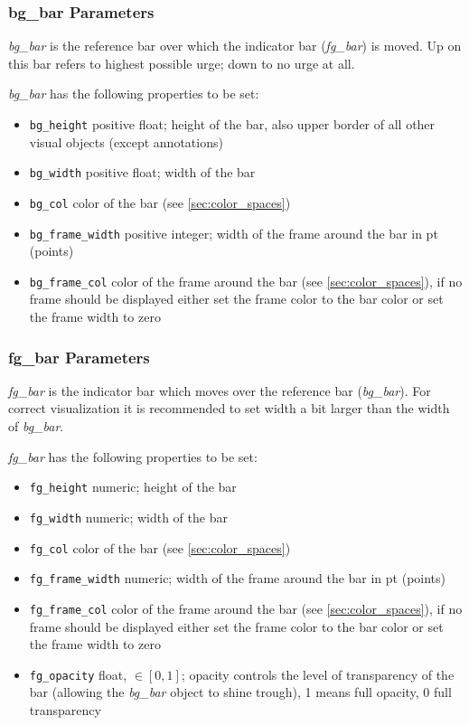 \documentclass[12pt,a4paper]{book}
\begin{document}
\subsubsection{bg\_bar Parameters}

\textit{bg\_bar} is the reference bar over which the indicator bar (\textit{fg\_bar}) is moved. Up on this bar refers to highest possible urge; down to no urge at all.

\textit{bg\_bar} has the following properties to be set:
\begin{itemize}
\item \verb|bg_height| positive float; height of the bar, also upper border of all other visual objects (except annotations)
\item \verb|bg_width| positive float; width of the bar
\item \verb|bg_col| color of the bar (see \ref{sec:color_spaces})
\item \verb|bg_frame_width| positive integer; width of the frame around the bar in pt (points)
\item \verb|bg_frame_col| color of the frame around the bar (see \ref{sec:color_spaces}), if no frame should be displayed either set the frame color to the bar color or set the frame width to zero
\end{itemize}


\subsubsection{fg\_bar Parameters}

\textit{fg\_bar} is the indicator bar which moves over the reference bar (\textit{bg\_bar}). For correct visualization it is recommended to set width a bit larger than the width of \textit{bg\_bar}.

\textit{fg\_bar} has the following properties to be set:
\begin{itemize}
\item \verb|fg_height| numeric; height of the bar
\item \verb|fg_width| numeric; width of the bar
\item \verb|fg_col| color of the bar (see \ref{sec:color_spaces})
\item \verb|fg_frame_width| numeric; width of the frame around the bar in pt (points)
\item \verb|fg_frame_col| color of the frame around the bar  (see \ref{sec:color_spaces}), if no frame should be displayed either set the frame color to the bar color or set the frame width to zero
\item \verb|fg_opacity| float, $\in [0, 1]$; opacity controls the level of transparency of the bar (allowing the \textit{bg\_bar} object to shine trough), 1 means full opacity, 0 full transparency
\end{itemize}
\end{document}
